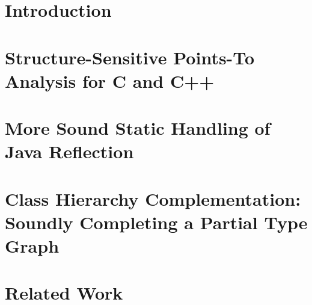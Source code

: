 \documentclass[inscr,ack,preface]{diphdthesis}
\begin{document}

\frontmatter



\mainmatter

\chapter{Introduction}



\chapter[Structure-Sensitive Points-To Analysis for C and C++]{%
  Structure-Sensitive Points-To Analysis \NoCaseChange{\\} for C and C++}


\chapter{%
  More Sound Static Handling of Java Reflection}


\chapter[Class Hierarchy Complementation for Java]{%
  Class Hierarchy Complementation: \NoCaseChange{\\}
  Soundly Completing a Partial Type Graph}


\chapter{Related Work}

\end{document}
